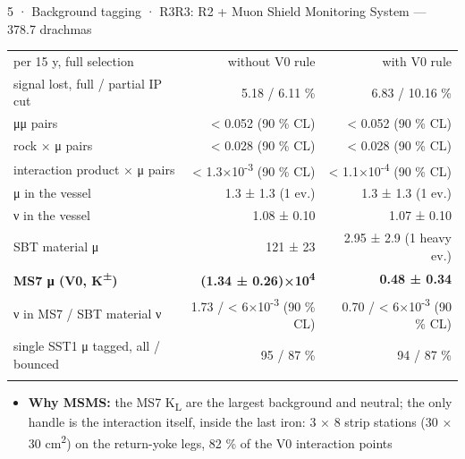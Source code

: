 \begin{btframe}{5 · Background tagging · R3}{R3: R2 + Muon Shield Monitoring System — 378.7 drachmas}
{\centering {}\par}
\vspace{2.46pt}
\noindent \begin{minipage}[c]{0.5\linewidth}
{\fontsize{5.31pt}{6.90pt}\selectfont\setlength{\tabcolsep}{3.72pt}\renewcommand{\arraystretch}{1.42}
\begin{tabular}{lrr}
\textcolor{muted}{per 15 y, full selection} & \textcolor{muted}{without V0 rule} & \textcolor{muted}{with V0 rule} \\\headrule
signal lost, full / partial IP cut & 5.18 / 6.11 \% & 6.83 / 10.16 \% \\\rowrule
μμ pairs & < 0.052 (90 \% CL) & < 0.052 (90 \% CL) \\\rowrule
rock × μ pairs & < 0.028 (90 \% CL) & < 0.028 (90 \% CL) \\\rowrule
interaction product × μ pairs & < 1.3×10\textsuperscript{-3} (90 \% CL) & < 1.1×10\textsuperscript{-4} (90 \% CL) \\\rowrule
μ in the vessel & 1.3 ± 1.3 (1 ev.) & 1.3 ± 1.3 (1 ev.) \\\rowrule
ν in the vessel & 1.08 ± 0.10 & 1.07 ± 0.10 \\\rowrule
SBT material μ & 121 ± 23 & 2.95 ± 2.9 (1 heavy ev.) \\\rowrule
\rowcolor{tint}\bfseries MS7 μ (V0, K\textsuperscript{±}) & \bfseries (1.34 ± 0.26)×10\textsuperscript{4} & \bfseries 0.48 ± 0.34 \\\rowrule
ν in MS7 / SBT material ν & 1.73 / < 6×10\textsuperscript{-3} (90 \% CL) & 0.70 / < 6×10\textsuperscript{-3} (90 \% CL) \\\rowrule
single SST1 μ tagged, all / bounced & 95 / 87 \% & 94 / 87 \% \\\rowrule
\end{tabular}\par}
\end{minipage}%
\hfill%
\begin{minipage}[c]{0.5\linewidth}
{\fontsize{6.15pt}{8.60pt}\selectfont
\begin{itemize}
  \item \textbf{Why MSMS:} the MS7 K\textsubscript{L} are the largest background and neutral; the only handle is the interaction itself, inside the last iron: 3 × 8 strip stations (30 × 30 cm\textsuperscript{2}) on the return-yoke legs, 82 \% of the V0 interaction points

\end{itemize}}
\end{minipage}
\end{btframe}
